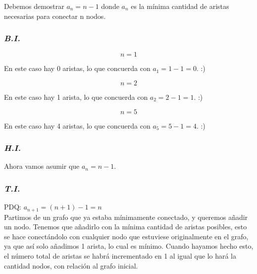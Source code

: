 \documentclass[../doc.tex]{subfiles}
\begin{document}
Debemos demostrar $ a_n = n - 1 $ donde $ a_n $ es la mínima cantidad de aristas
necesarias para conectar n nodos.

\subsubsection*{\emph{B.I.}}
\[ n = 1 \]

\begin{center}
\end{center}
En este caso hay 0 aristas, lo que concuerda con $a_1 = 1 - 1 = 0$. :)

\[ n = 2 \]

\begin{center}
\end{center}
En este caso hay 1 arista, lo que concuerda con $a_2 = 2 - 1 = 1$. :)


\[ n = 5 \]

\begin{center}
\end{center}
En este caso hay 4 aristas, lo que concuerda con $a_5 = 5 - 1 = 4$. :)

\subsubsection*{\emph{H.I.}}
Ahora vamos asumir que $ a_n = n - 1 $.

\subsubsection*{\emph{T.I.}}
PDQ: $a_{n+1} = (n + 1) -1 = n$ \\
Partimos de un grafo que ya estaba mínimamente conectado, y queremos añadir un
nodo. Tenemos que añadirlo con la mínima cantidad de aristas posibles, esto se
hace conectándolo con cualquier nodo que estuviese originalmente en el grafo,
ya que así solo añadimos 1 arista, lo cual es mínimo. Cuando hayamos hecho
esto, el número total de aristas se habrá incrementado en 1 al igual que lo
hará la cantidad nodos, con relación al grafo inicial.
\end{document}
